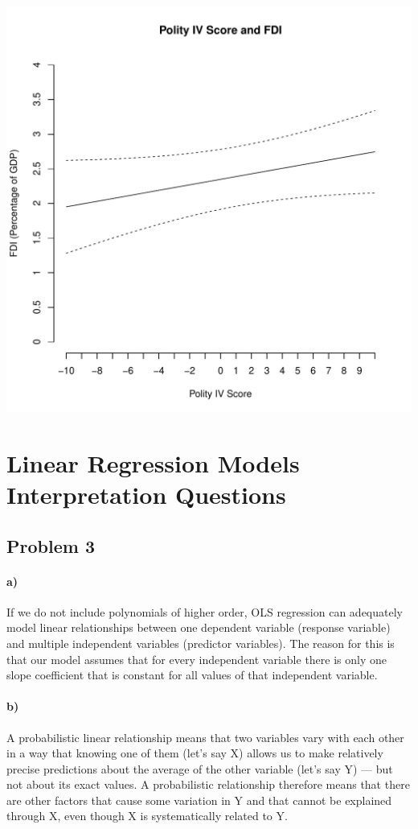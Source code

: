 \documentclass[12pt,letter]{article}\usepackage[]{graphicx}\usepackage[]{color}
\makeatletter
\def\maxwidth{ %
  \ifdim\Gin@nat@width>\linewidth
    \linewidth
  \else
    \Gin@nat@width
  \fi
}
\newenvironment{knitrout}{}{} %
\makeatother
\begin{document}
\begin{knitrout}
\includegraphics[width=\maxwidth]{figure/unnamed-chunk-3-1} 

\end{knitrout}



\section*{Linear Regression Models Interpretation Questions}

\subsection*{Problem 3}

\paragraph*{a)} If we do not include polynomials of higher order, OLS regression can adequately model linear relationships between one dependent variable (response variable) and multiple independent variables (predictor variables). The reason for this is that our model assumes that for every independent variable there is only one slope coefficient that is constant for all values of that independent variable.

\paragraph*{b)} A probabilistic linear relationship means that two variables vary with each other in a way that knowing one of them (let's say X) allows us to make relatively precise predictions about the average of the other variable (let's say Y) --- but not about its exact values. A probabilistic relationship therefore means that there are other factors that cause some variation in Y and that cannot be explained through X, even though X is systematically related to Y.
\end{document}

